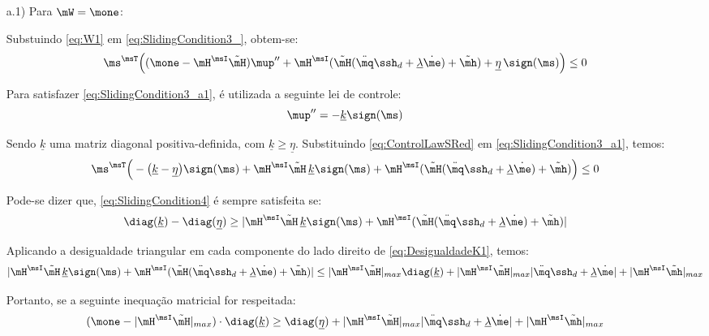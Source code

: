 \documentclass[]{politex}
\begin{document}
\begin{itemize}
\begin{itemize}
\item[a.1)] Para $\mW = \mone$:


Substuindo \eqref{eq:W1} em \eqref{eq:SlidingCondition3_}, obtem-se:
\begin{equation} \label{eq:SlidingCondition3_a1}
\ms^\msT \Big((\mone - \mH^\msI \tilde{\mH} )\mup'' + \mH^\msI( \tilde{\mH}(\ddot{\mq}\ssh_d + \underline{\lambda} \dot{\me}) + \tilde{\mh} ) + \underline{\eta} \, \sign(\ms) \Big) \leq 0
\end{equation}

Para satisfazer \eqref{eq:SlidingCondition3_a1}, é utilizada a seguinte lei de controle:
\begin{equation} \label{eq:ControlLawSRed}
\mup'' =  -\underline{k} \sign(\ms)
\end{equation}

Sendo $\underline{k}$ uma matriz diagonal positiva-definida, com $\underline{k} \geq \underline{\eta} $. Substituindo \eqref{eq:ControlLawSRed} em \eqref{eq:SlidingCondition3_a1}, temos:
\begin{equation} \label{eq:SlidingCondition4}
\ms^\msT \Big(- \big(\underline{k} - \underline{\eta} \big)  \sign(\ms) + \mH^\msI \tilde{\mH} \, \underline{k} \sign(\ms) + \mH^\msI( \tilde{\mH}(\ddot{\mq}\ssh_d + \underline{\lambda} \dot{\me}) + \tilde{\mh} ) \Big) \leq 0
\end{equation}

Pode-se dizer que, \eqref{eq:SlidingCondition4} \'e sempre satisfeita se:
\begin{equation} \label{eq:DesigualdadeK1}
 \diag(\underline{k}) - \diag(\underline{\eta}) \geq  | \mH^\msI \tilde{\mH} \, \underline{k} \sign(\ms) + \mH^\msI( \tilde{\mH}(\ddot{\mq}\ssh_d + \underline{\lambda} \dot{\me}) + \tilde{\mh} ) |
\end{equation}

Aplicando a desigualdade triangular em cada componente do lado direito de \eqref{eq:DesigualdadeK1}, temos:
\begin{equation}
| \mH^\msI \tilde{\mH} \, \underline{k} \sign(\ms) + \mH^\msI( \tilde{\mH}(\ddot{\mq}\ssh_d + \underline{\lambda} \dot{\me}) + \tilde{\mh} ) | \leq | \mH^\msI \tilde{\mH}|_{max} \diag(\underline{k}) +  |\mH^\msI \tilde{\mH}|_{max} |\ddot{\mq}\ssh_d + \underline{\lambda} \dot{\me}| + |\mH^\msI\tilde{\mh}|_{max}
\end{equation}

Portanto, se a seguinte inequa\c{c}\~ao matricial for respeitada:
\begin{equation} \label{eq:DesigualdadeK2_a1}
(\mone - | \mH^\msI \tilde{\mH}|_{max} ) \cdot \diag(\underline{k})  \geq \diag(\underline{\eta}) + |\mH^\msI \tilde{\mH}|_{max} |\ddot{\mq}\ssh_d + \underline{\lambda} \dot{\me}| + |\mH^\msI\tilde{\mh}|_{max}
\end{equation}


\end{itemize}
\end{itemize}
\end{document}
